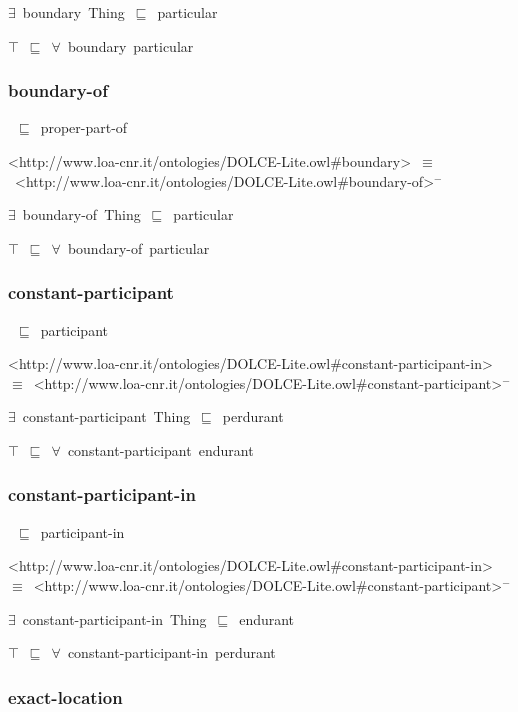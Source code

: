 \documentclass{article}
\begin{document}
\ensuremath{\exists}~boundary~Thing~\ensuremath{\sqsubseteq}~particular

\ensuremath{\top}~\ensuremath{\sqsubseteq}~\ensuremath{\forall}~boundary~particular

\subsubsection*{boundary-of}

~\ensuremath{\sqsubseteq}~proper-part-of

<http://www.loa-cnr.it/ontologies/DOLCE-Lite.owl#boundary>~\ensuremath{\equiv}~<http://www.loa-cnr.it/ontologies/DOLCE-Lite.owl#boundary-of>\ensuremath{^-}

\ensuremath{\exists}~boundary-of~Thing~\ensuremath{\sqsubseteq}~particular

\ensuremath{\top}~\ensuremath{\sqsubseteq}~\ensuremath{\forall}~boundary-of~particular

\subsubsection*{constant-participant}

~\ensuremath{\sqsubseteq}~participant

<http://www.loa-cnr.it/ontologies/DOLCE-Lite.owl#constant-participant-in>~\ensuremath{\equiv}~<http://www.loa-cnr.it/ontologies/DOLCE-Lite.owl#constant-participant>\ensuremath{^-}

\ensuremath{\exists}~constant-participant~Thing~\ensuremath{\sqsubseteq}~perdurant

\ensuremath{\top}~\ensuremath{\sqsubseteq}~\ensuremath{\forall}~constant-participant~endurant

\subsubsection*{constant-participant-in}

~\ensuremath{\sqsubseteq}~participant-in

<http://www.loa-cnr.it/ontologies/DOLCE-Lite.owl#constant-participant-in>~\ensuremath{\equiv}~<http://www.loa-cnr.it/ontologies/DOLCE-Lite.owl#constant-participant>\ensuremath{^-}

\ensuremath{\exists}~constant-participant-in~Thing~\ensuremath{\sqsubseteq}~endurant

\ensuremath{\top}~\ensuremath{\sqsubseteq}~\ensuremath{\forall}~constant-participant-in~perdurant

\subsubsection*{exact-location}
\end{document}
